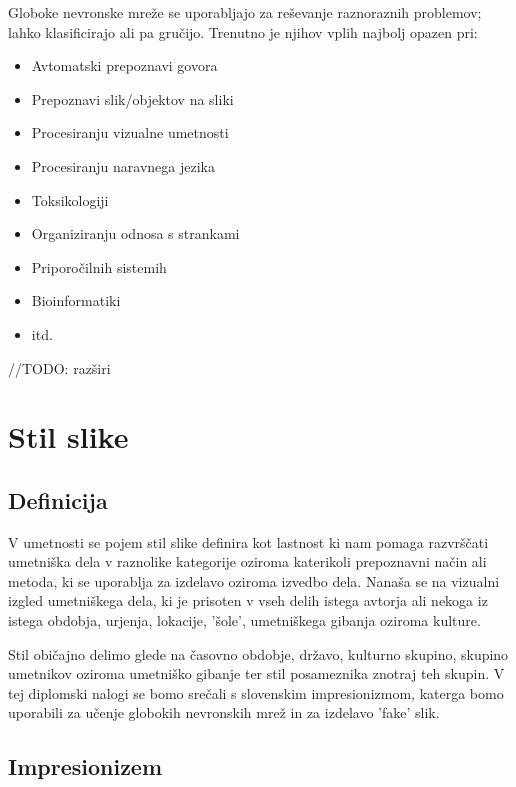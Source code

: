 \documentclass[a4paper, 12pt]{book}
\begin{document}
Globoke nevronske mreže se uporabljajo za reševanje raznoraznih problemov; lahko klasificirajo ali pa gručijo. Trenutno je njihov vplih najbolj opazen pri:
\begin{itemize}
  \item Avtomatski prepoznavi govora
  \item Prepoznavi slik/objektov na sliki
  \item Procesiranju vizualne umetnosti
  \item Procesiranju naravnega jezika
  \item Toksikologiji
  \item Organiziranju odnosa s strankami
  \item Priporočilnih sistemih
  \item Bioinformatiki
  \item itd.


\end{itemize}

//TODO: razširi

\chapter{Stil slike}
\label{stil}

\section{Definicija}

V umetnosti se pojem stil slike definira kot lastnost ki nam pomaga razvrščati umetniška dela v raznolike kategorije oziroma katerikoli prepoznavni način ali metoda, ki se uporablja za izdelavo oziroma izvedbo dela. Nanaša se na vizualni izgled umetniškega dela, ki je prisoten v vseh delih istega avtorja ali nekoga iz istega obdobja, urjenja, lokacije, 'šole', umetniškega gibanja oziroma kulture.\cite{wikiStil}


Stil običajno delimo glede na časovno obdobje, državo, kulturno skupino, skupino umetnikov oziroma umetniško gibanje ter stil posameznika znotraj teh skupin.
V tej diplomski nalogi se bomo srečali s slovenskim impresionizmom, katerga bomo uporabili za učenje globokih nevronskih mrež in za izdelavo 'fake' slik.



\section{Impresionizem}
\end{document}
